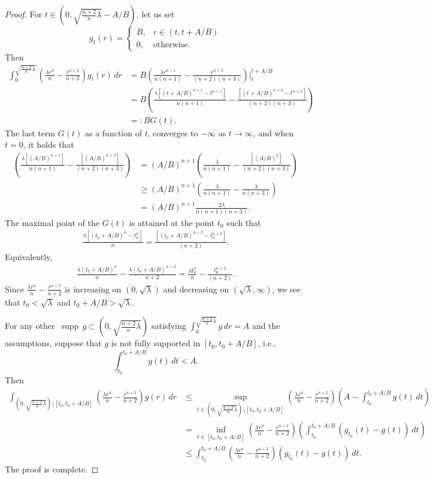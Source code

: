 \documentclass[11pt,twoside, leqno]{article}
\def\supp{{\mathop\mathrm{\,supp\,}}}
\numberwithin{equation}{section}
\begin{document}
\begin{proof}
For $t\in (0,\sqrt{\frac{n+2}{n}\lambda}-A/B )$, let us set
$$g_t(r)=
\begin{cases}
B, & r\in (t,t+A/B)\\
0, & \mbox{otherwise}.
\end{cases}
$$
Then
\begin{align*}
\int_0^{\sqrt{\frac{n+2}{n}\lambda}} \left(\frac{\lambda r^n}{n} -\frac{r^{n+2}}{n+2}\right)g_t(r)\,dr&=B\left(\frac{\lambda r^{n+1}}{n(n+1)}-\frac{r^{n+3}}{(n+2)(n+3)}\right)\bigg|_{t}^{t+A/B}\\
&=B\left(\frac{\lambda \left[(t+A/B)^{n+1}-t^{n+1}\right]}{n(n+1)}-\frac{\left[(t+A/B)^{n+3}-t^{n+3}\right]}{(n+2)(n+3)}\right)\\
&=:B G(t).
\end{align*}
The last term $G(t)$ as a function of $t$, converges to $-\infty$ as $t\to\infty$, and when $t=0$, it holds that
\begin{align*}
\left(\frac{\lambda \left[(A/B)^{n+1}\right]}{n(n+1)}-\frac{\left[(A/B)^{n+3}\right]}{(n+2)(n+3)}\right)& =(A/B)^{n+1} \left(\frac{\lambda }{n(n+1)}-\frac{\left[(A/B)^{2}\right]}{(n+2)(n+3)}\right)\\
&\ge (A/B)^{n+1} \left(\frac{\lambda }{n(n+1)}-\frac{\lambda}{n(n+3)}\right)\\
&= (A/B)^{n+1} \frac{2\lambda }{n(n+1)(n+3)}.
\end{align*}
The maximal point of the $G(t)$ is attained at the point $t_0$ such that
\begin{align*}
\frac{\lambda \left[(t_0+A/B)^{n}-t_0^{n}\right]}{n}=\frac{\left[(t_0+A/B)^{n+2}-t_0^{n+2}\right]}{(n+2)}.
\end{align*}
Equivalently,
\begin{align*}
\frac{\lambda(t_0+A/B)^{n}}{n}-\frac{\lambda(t_0+A/B)^{n+2}}{n+2} =\frac{\lambda t_0^{n}}{n}-\frac{t_0^{n+2}}{(n+2)}.
\end{align*}
Since $\frac{\lambda r^n}{n} -\frac{r^{n+2}}{n+2}$ is increasing on $(0,\sqrt\lambda)$ and decreasing on $(\sqrt\lambda,\infty)$, we see that
$t_0<\sqrt\lambda$ and $t_0+A/B>\sqrt{\lambda}$.


For any other $\supp g\subset (0,\sqrt{\frac{n+2}{n}\lambda})$ satisfying $\int_0^{\sqrt{\frac{n+2}{n}\lambda}} g\,dr=A$ and the assumptions,
suppose that $g$ is not fully supported in $[t_0,t_0+A/B]$, i.e.,
$$\int_{t_0}^{t_0+A/B} g(t)\,dt<A.$$
Then
\begin{align*}
\int_{(0,\sqrt{\frac{n+2}{n}\lambda})\setminus [t_0,t_0+A/B]} \left(\frac{\lambda r^n}{n} -\frac{r^{n+2}}{n+2}\right)g(r)\,dr&\le
\sup_{t\in (0,\sqrt{\frac{n+2}{n}\lambda})\setminus [t_0,t_0+A/B]}\left(\frac{\lambda r^n}{n} -\frac{r^{n+2}}{n+2}\right) \left(A-\int_{t_0}^{t_0+A/B} g(t)\,dt\right) \\
&=\inf_{t\in [t_0,t_0+A/B]}\left(\frac{\lambda r^n}{n} -\frac{r^{n+2}}{n+2}\right) \left(\int_{t_0}^{t_0+A/B} \left(g_{t_0}(t)-g(t)\right)\,dt\right)\\
&\le \int_{t_0}^{t_0+A/B} \left(\frac{\lambda r^n}{n} -\frac{r^{n+2}}{n+2}\right)\left(g_{t_0}(t)-g(t)\right)\,dt.
\end{align*}
The proof is complete.
\end{proof}
\end{document}
